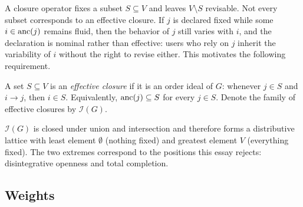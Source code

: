 A closure operator fixes a subset $S\subseteq V$ and leaves $V\setminus S$ revisable. Not every subset corresponds to an effective closure. If $j$ is declared fixed while some $i\in\operatorname{anc}(j)$ remains fluid, then the behavior of $j$ still varies with $i$, and the declaration is nominal rather than effective: users who rely on $j$ inherit the variability of $i$ without the right to revise either. This motivates the following requirement.

\begin{definition}
A set $S\subseteq V$ is an \emph{effective closure} if it is an order ideal of $G$: whenever $j\in S$ and $i\to j$, then $i\in S$. Equivalently, $\operatorname{anc}(j)\subseteq S$ for every $j\in S$. Denote the family of effective closures by $\mathcal{I}(G)$.
\end{definition}

$\mathcal{I}(G)$ is closed under union and intersection and therefore forms a distributive lattice with least element $\emptyset$ (nothing fixed) and greatest element $V$ (everything fixed). The two extremes correspond to the positions this essay rejects: disintegrative openness and total completion.

\subsection{Weights}

